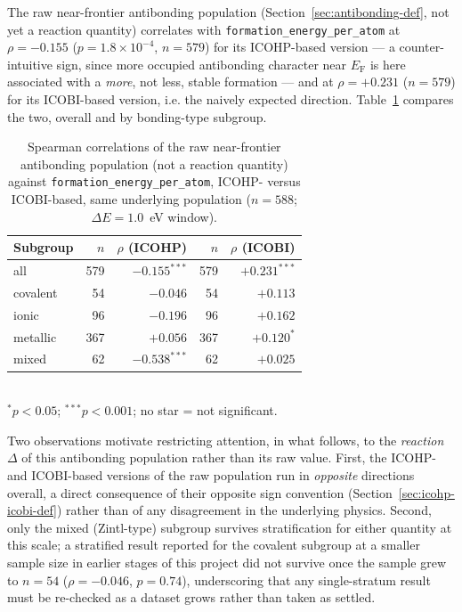 \documentclass[journal=jpccck,manuscript=article]{achemso}
\begin{document}
The raw near-frontier antibonding population (Section~\ref{sec:antibonding-def},
not yet a reaction quantity) correlates with \texttt{formation\_energy\_per\_atom}
at $\rho=-0.155$ ($p=1.8\times10^{-4}$, $n=579$) for its ICOHP-based version
--- a counter-intuitive sign, since more occupied antibonding character near
$E_\text{F}$ is here associated with a \emph{more}, not less, stable
formation --- and at $\rho=+0.231$ ($n=579$) for its ICOBI-based version,
i.e. the naively expected direction. Table~\ref{tab:antibonding-icohp-icobi}
compares the two, overall and by bonding-type subgroup.

\begin{table}[htbp]
\centering
\caption{Spearman correlations of the raw near-frontier antibonding
population (not a reaction quantity) against
\texttt{formation\_energy\_per\_atom}, ICOHP- versus ICOBI-based, same
underlying population ($n=588$; $\Delta E = 1.0$~eV window).}
\label{tab:antibonding-icohp-icobi}
\begin{tabular}{@{}lrrrr@{}}
\toprule
Subgroup & $n$ & $\rho$ (ICOHP) & $n$ & $\rho$ (ICOBI) \\
\midrule
all              & 579 & $-0.155^{***}$ & 579 & $+0.231^{***}$ \\
covalent         & 54  & $-0.046$       & 54  & $+0.113$ \\
ionic            & 96  & $-0.196$       & 96  & $+0.162$ \\
metallic         & 367 & $+0.056$       & 367 & $+0.120^{*}$ \\
mixed            & 62  & $-0.538^{***}$ & 62  & $+0.025$ \\
\bottomrule
\end{tabular}
\vspace{0.1cm}
\\{\footnotesize $^{*}p<0.05$; $^{***}p<0.001$; no star = not significant.}
\end{table}

Two observations motivate restricting attention, in what follows, to the
\emph{reaction} $\Delta$ of this antibonding population rather than its raw
value. First, the ICOHP- and ICOBI-based versions of the raw population run
in \emph{opposite} directions overall, a direct consequence of their
opposite sign convention (Section~\ref{sec:icohp-icobi-def}) rather than of
any disagreement in the underlying physics. Second, only the mixed
(Zintl-type) subgroup survives stratification for either quantity at this
scale; a stratified result reported for the covalent subgroup at a smaller
sample size in earlier stages of this project did not survive once the
sample grew to $n=54$ ($\rho=-0.046$, $p=0.74$), underscoring that any
single-stratum result must be re-checked as a dataset grows rather than
taken as settled.
\end{document}
